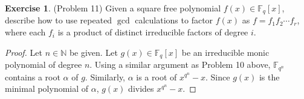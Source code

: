 \documentclass[12pt, psamsfonts]{amsart}
\theoremstyle{definition}
\newtheorem*{exer}{Exercise}
\theoremstyle{remark}
\numberwithin{equation}{section}
\begin{document}
\begin{exer}{(Problem 11)}
  Given a square free polynomial $f(x) \in \mathbb{F}_q[x]$, describe how to use repeated $\gcd$ calculations to factor $f(x)$ as $f = f_1f_2 \cdots f_r$, where each $f_i$ is a product of distinct irreducible factors of degree $i$.
\end{exer}

\begin{proof}
  Let $n \in \mathbb{N}$ be given.
  Let $g(x) \in \mathbb{F}_q[x]$ be an irreducible monic polynomial of degree $n$.
  Using a similar argument as Problem 10 above, $\mathbb{F}_{q^n}$ contains a root $\alpha$ of $g$.
  Similarly, $\alpha$ is a root of $x^{q^n} - x$.
  Since $g(x)$ is the minimal polynomial of $\alpha$, $g(x)$ divides $x^{q^n} - x$.
\end{proof}
\end{document}
